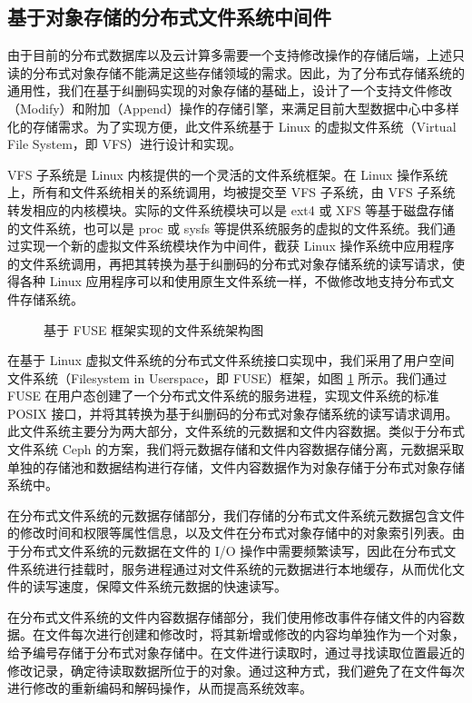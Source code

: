 \subsection{基于对象存储的分布式文件系统中间件}
由于目前的分布式数据库以及云计算多需要一个支持修改操作的存储后端，上述只读的分布式对象存储不能满足这些存储领域的需求。因此，为了分布式存储系统的通用性，我们在基于纠删码实现的对象存储的基础上，设计了一个支持文件修改（Modify）和附加（Append）操作的存储引擎，来满足目前大型数据中心中多样化的存储需求。为了实现方便，此文件系统基于 Linux 的虚拟文件系统（Virtual File System，即 VFS）进行设计和实现。

VFS 子系统是 Linux 内核提供的一个灵活的文件系统框架\cite{wetzel2017virtual}。在 Linux 操作系统上，所有和文件系统相关的系统调用，均被提交至 VFS 子系统，由 VFS 子系统转发相应的内核模块。实际的文件系统模块可以是 ext4 或 XFS 等基于磁盘存储的文件系统，也可以是 proc 或 sysfs 等提供系统服务的虚拟的文件系统。我们通过实现一个新的虚拟文件系统模块作为中间件，截获 Linux 操作系统中应用程序的文件系统调用，再把其转换为基于纠删码的分布式对象存储系统的读写请求，使得各种 Linux 应用程序可以和使用原生文件系统一样，不做修改地支持分布式文件存储系统。

\begin{figure}[!htb]
\centering
\resizebox{.8\textwidth}{!}{}
\caption{基于 FUSE 框架实现的文件系统架构图}
\label{p3}
\end{figure}

在基于 Linux 虚拟文件系统的分布式文件系统接口实现中，我们采用了用户空间文件系统（Filesystem in Userspace，即 FUSE）框架，如图 \ref{p3} 所示。我们通过 FUSE 在用户态创建了一个分布式文件系统的服务进程，实现文件系统的标准 POSIX 接口，并将其转换为基于纠删码的分布式对象存储系统的读写请求调用。此文件系统主要分为两大部分，文件系统的元数据和文件内容数据。类似于分布式文件系统 Ceph 的方案，我们将元数据存储和文件内容数据存储分离，元数据采取单独的存储池和数据结构进行存储，文件内容数据作为对象存储于分布式对象存储系统中。

在分布式文件系统的元数据存储部分，我们存储的分布式文件系统元数据包含文件的修改时间和权限等属性信息，以及文件在分布式对象存储中的对象索引列表。由于分布式文件系统的元数据在文件的 I/O 操作中需要频繁读写，因此在分布式文件系统进行挂载时，服务进程通过对文件系统的元数据进行本地缓存，从而优化文件的读写速度，保障文件系统元数据的快速读写。

在分布式文件系统的文件内容数据存储部分，我们使用修改事件存储文件的内容数据。在文件每次进行创建和修改时，将其新增或修改的内容均单独作为一个对象，给予编号存储于分布式对象存储中。在文件进行读取时，通过寻找读取位置最近的修改记录，确定待读取数据所位于的对象。通过这种方式，我们避免了在文件每次进行修改的重新编码和解码操作，从而提高系统效率。
